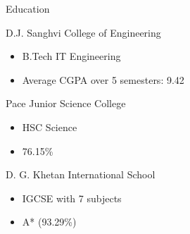 \documentclass{article}
\newlength{\tabin}
\newlength{\secsep}
\newcommand{\lineunder}{\vspace*{-8pt} \\ \hspace*{-6pt} \hrulefill \\ \vspace*{-15pt}}
\newenvironment{tabbedsection}[1]{
	\begin{list}{}{
		\setlength{\itemsep}{0pt}
		\setlength{\labelsep}{0pt}
		\setlength{\labelwidth}{0pt}
		\setlength{\leftmargin}{\tabin}
		\setlength{\rightmargin}{\tabin}
		\setlength{\listparindent}{0pt}
		\setlength{\parsep}{0pt}
		\setlength{\parskip}{0pt}
		\setlength{\partopsep}{0pt}
		\setlength{\topsep}{#1}
	}
	\item[]
}{\end{list}}
\newenvironment{resume_section}[1]{
	\filbreak
	\vspace{2\secsep}
	\textsc{\large#1}
	\lineunder
	\begin{tabbedsection}{\secsep}
}{\end{tabbedsection}}
\newenvironment{resume_subsection}[2][]{
	\textbf{#2} \hfill {\footnotesize #1} \hspace{2em}
	\begin{tabbedsection}{0.5\secsep}
}{\end{tabbedsection}}
\newenvironment{subitems}{
	\renewcommand{\labelitemi}{-}
	\begin{itemize}
		\setlength{\labelsep}{1em}
}{\end{itemize}}
\begin{document}
\begin{resume_section}{Education}

	\begin{resume_subsection}[2019 - 2023 (expected)]{D.J. Sanghvi College of Engineering}
		\begin{subitems}
			\item B.Tech IT Engineering
			\item Average CGPA over 5 semesters: 9.42
		\end{subitems}
	\end{resume_subsection}


	\begin{resume_subsection}[2017 - 2019]{Pace Junior Science College}
		\begin{subitems}
			\item HSC Science
		\item 76.15{\%}
		\end{subitems}
	\end{resume_subsection}

	\begin{resume_subsection}[2017]{D. G. Khetan International School}
		\begin{subitems}
			\item IGCSE with 7 subjects
		\item A* (93.29{\%})
		\end{subitems}
	\end{resume_subsection}

\end{resume_section}

\vspace{1cm}
\end{document}
